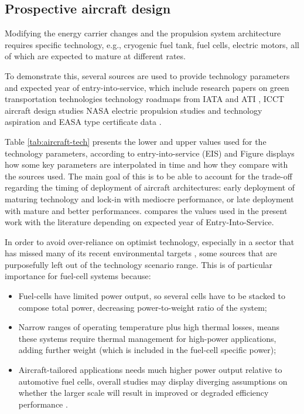 \documentclass[
]{kaohandt}
\begin{document}
\subsection{Prospective aircraft design}
\label{subsec:aircraft-design}

Modifying the energy carrier changes and the propulsion system architecture requires specific technology, e.g., cryogenic fuel tank, fuel cells, electric motors, all of which are expected to mature at different rates.

To demonstrate this, several sources are used to provide technology parameters and expected year of entry-into-service, which include research papers on green transportation technologies  technology roadmaps from IATA  and ATI , ICCT aircraft design studies   NASA electric propulsion studies and technology aspiration  and EASA type certificate data .

Table \ref{tab:aircraft-tech} presents the lower and upper values used for the technology parameters, according to entry-into-service (EIS) and Figure  displays how some key parameters are interpolated in time and how they compare with the sources used. The main goal of this is to be able to account for the trade-off regarding the timing of deployment of aircraft architectures: early deployment of maturing technology and lock-in with mediocre performance, or late deployment with mature and better performances.  compares the values used in the present work with the literature depending on expected year of Entry-Into-Service.

In order to avoid over-reliance on optimist technology, especially in a sector that has missed many of its recent environmental targets , some sources that are purposefully left out of the technology scenario range. This is of particular importance for fuel-cell systems because:

\begin{itemize}
    \item Fuel-cells have limited power output, so several cells have to be stacked to compose total power, decreasing power-to-weight ratio of the system;
    \item Narrow ranges of operating temperature plus high thermal losses, means these systems require thermal management for high-power applications, adding further weight (which is included in the fuel-cell specific power);
    \item Aircraft-tailored applications needs much higher power output relative to automotive fuel cells, overall studies may display diverging assumptions on whether the larger scale will result in improved \cite{icct_fuelcell} or degraded efficiency performance .
\end{itemize}
\end{document}
